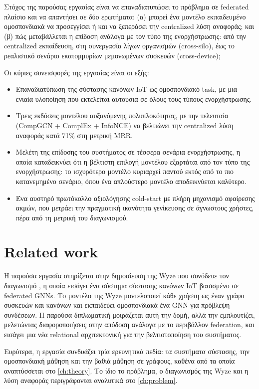 Στόχος της παρούσας εργασίας είναι να επαναδιατυπώσει το πρόβλημα σε federated πλαίσιο και να απαντήσει σε δύο ερωτήματα: (α) μπορεί ένα μοντέλο εκπαιδευμένο ομοσπονδιακά να προσεγγίσει ή και να ξεπεράσει την centralized λύση αναφοράς; και (β) πώς μεταβάλλεται η επίδοση ανάλογα με τον τύπο της ενορχήστρωσης: από την centralized εκπαίδευση, στη συνεργασία λίγων οργανισμών (cross-silo), έως το ρεαλιστικό σενάριο εκατομμυρίων μεμονωμένων συσκευών (cross-device);

Οι κύριες συνεισφορές της εργασίας είναι οι εξής:
\begin{itemize}
  \item Επαναδιατύπωση της σύστασης κανόνων IoT ως ομοσπονδιακό task, με μια ενιαία υλοποίηση που εκτελείται αυτούσια σε όλους τους τύπους ενορχήστρωσης.
  \item Τρεις εκδόσεις μοντέλου αυξανόμενης πολυπλοκότητας, με την τελευταία (CompGCN + ComplEx + InfoNCE) να βελτιώνει την centralized λύση αναφοράς κατά 71\% στη μετρική MRR.
  \item Μελέτη της επίδοσης του συστήματος σε τέσσερα σενάρια ενορχήστρωσης, η οποία καταδεικνύει ότι η βέλτιστη επιλογή μοντέλου εξαρτάται από τον τύπο της ενορχήστρωσης: το ισχυρότερο μοντέλο κυριαρχεί παντού εκτός από το πιο κατανεμημένο σενάριο, όπου ένα απλούστερο μοντέλο αποδεικνύεται καλύτερο.
  \item Ένα αυστηρό πρωτόκολλο αξιολόγησης cold-start με πλήρη μηχανισμό αφαίρεσης ακμών, που μετράει την πραγματική ικανότητα γενίκευσης σε άγνωστους χρήστες, πέρα από τη μετρική του διαγωνισμού.
\end{itemize}

\section{Related work}\label{sec:intro-related}
Η παρούσα εργασία στηρίζεται στην δημοσίευση της Wyze που συνόδευε τον διαγωνισμό \cite{yao_fedrule_2022,yao_yh-yaofedrule_2025}, η οποία εισάγει ένα σύστημα σύστασης κανόνων IoT βασισμένο σε federated GNNs. Το μοντέλο της Wyze μοντελοποιεί κάθε χρήστη ως έναν γράφο συσκευών και κανόνων και εκπαιδεύει ομοσπονδιακά ένα GNN για πρόβλεψη συνδέσεων. Η παρούσα διπλωματική μοιράζεται αυτή την δομή, αλλά την εμπλουτίζει, μελετώντας διαφοροποιήσεις στην απόδοση ανάλογα με το περιβάλλον federation, και εισάγει μια νέα relational αρχιτεκτονική για την βελτιστοποίηση του συστήματος.

Ευρύτερα, η εργασία συνδυάζει τρία ερευνητικά πεδία: τα συστήματα σύστασης, την ομοσπονδιακή μάθηση και την βαθιά μάθηση σε γράφους, καθένα από τα οποία αναπτύσσεται στο \autoref{ch:theory}. Το ίδιο το πρόβλημα, ο διαγωνισμός της Wyze και η λύση αναφοράς περιγράφονται αναλυτικά στο \autoref{ch:problem}.

